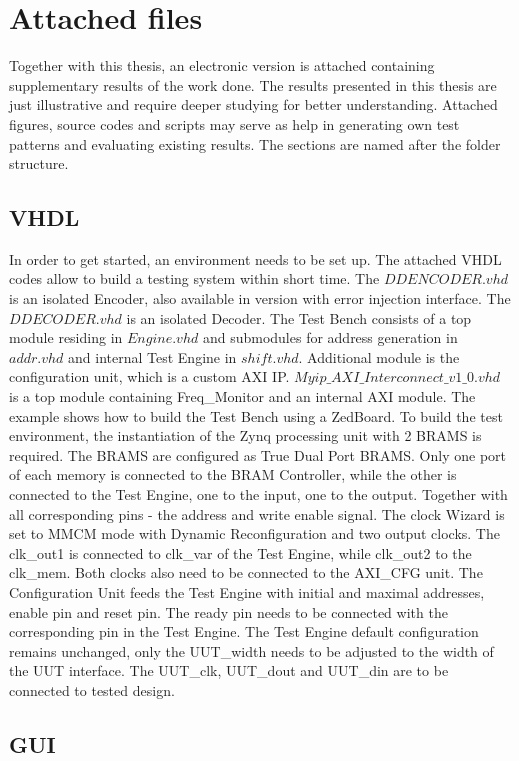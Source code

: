 \chapter{Attached files}
Together with this thesis, an electronic version is attached containing supplementary results of the work done. The results presented in this thesis are just illustrative and require deeper studying for better understanding. Attached figures, source codes and scripts may serve as help in generating own test patterns and evaluating existing results. The sections are named after the folder structure.
\section{VHDL}
In order to get started, an environment needs to be set up. The attached VHDL codes allow to build a testing system within short time. The $DDENCODER.vhd$ is an isolated Encoder, also available in version with error injection interface. The $DDECODER.vhd$ is an isolated Decoder. The Test Bench consists of a top module residing in $Engine.vhd$ and submodules for address generation in $addr.vhd$ and internal Test Engine in $shift.vhd$. Additional module is the configuration unit, which is a custom AXI IP. $Myip\_AXI\_Interconnect\_v1\_0.vhd$ is a top module containing Freq\_Monitor and an internal AXI module. The example shows how to build the Test Bench using a ZedBoard.
To build the test environment, the instantiation of the Zynq processing unit with 2 BRAMS is required. The BRAMS are configured as True Dual Port BRAMS. Only one port of each memory is connected to the BRAM Controller, while the other is connected to the Test Engine, one to the input, one to the output. Together with all corresponding pins - the address and write enable signal. The clock Wizard is set to MMCM mode with Dynamic Reconfiguration and two output clocks. The clk\_out1 is connected to clk\_var of the Test Engine, while clk\_out2 to the clk\_mem. Both clocks also need to be connected to the AXI\_CFG unit. The Configuration Unit feeds the Test Engine with initial and maximal addresses, enable pin and reset pin. The ready pin needs to be connected with the corresponding pin in the Test Engine.
The Test Engine default configuration remains unchanged, only the UUT\_width needs to be adjusted to the width of the UUT interface. The UUT\_clk, UUT\_dout and UUT\_din are to be connected to tested design.

\section{GUI}

